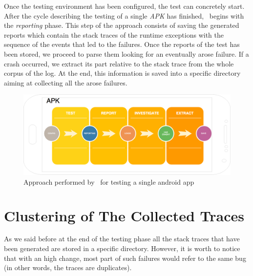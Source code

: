 Once the testing environment has been configured, the test can concretely start. 
After the cycle describing the testing of a single \textit{APK} has finished, \toolname\ begins with the \textit{reporting} phase. 
This step of the approach consists of saving the generated reports which contain the stack traces of the runtime exceptions with the sequence of the events that led to the failures. 
Once the reports of the test has been stored, we proceed to parse them looking for an eventually arose failure. If a crash occurred, we extract its part relative to the stack trace from the whole corpus of the log. At the end, this information is saved into a specific directory aiming at collecting all the arose failures.

\begin{figure}[tb]
\centering 
\includegraphics[width=\columnwidth]{imgs/apkprocess} 
\caption{Approach performed by \toolname\ for testing a single android app}
\label{fig: apkprocess}
\end{figure}






\section{Clustering of The Collected Traces}
\label{approach:clustering}
As we said before at the end of the testing phase all the stack traces that have been generated are stored in a specific directory. However, it is worth to notice that with an high change, most part of such failures would refer to the same bug (in other words, the traces are duplicates).


